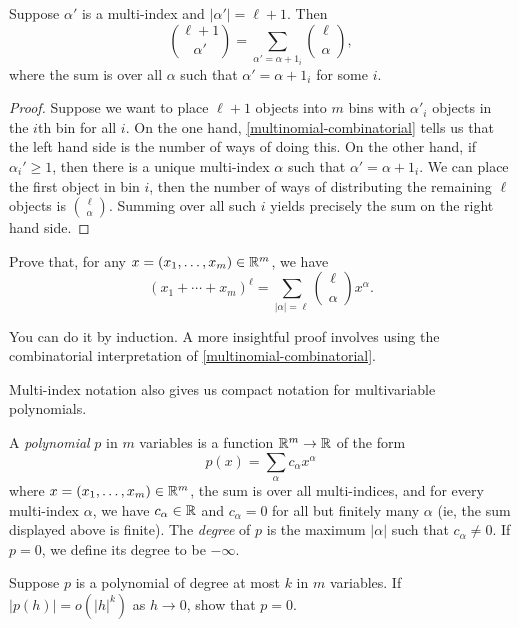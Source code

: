 \begin{corollary} \label{multinomial-recurrence}
	Suppose $\alpha'$ is a multi-index and $|\alpha'| = \ell + 1$. Then
	\[ \binom{\ell + 1}{\alpha'} = \sum_{\alpha' = \alpha + 1_i} \binom{\ell}{\alpha}, \]
	where the sum is over all $\alpha$ such that $\alpha' = \alpha + 1_i$ for some $i$. 
\end{corollary}

\begin{proof}
	Suppose we want to place $\ell + 1$ objects into $m$ bins with $\alpha'_i$ objects in the $i$th bin for all $i$. On the one hand, \cref{multinomial-combinatorial} tells us that the left hand side is the number of ways of doing this. On the other hand, if $\alpha_i' \geq 1$, then there is a unique multi-index $\alpha$ such that $\alpha' = \alpha + 1_i$. We can place the first object in bin $i$, then the number of ways of distributing the remaining $\ell$ objects is $\binom{\ell}{\alpha}$. Summing over all such $i$ yields precisely the sum on the right hand side. 
\end{proof}

\begin{exercise} \label{multinomial}
	Prove that, for any $x = (x_1, \dotsc, x_m) \in \mathbb{R}^m$, we have 
	\[ (x_1 + \dotsb + x_m)^\ell = \sum_{|\alpha| = \ell} \binom{\ell}{\alpha} x^\alpha. \]
	\begin{hint}
		You can do it by induction. A more insightful proof involves using the combinatorial interpretation of  \cref{multinomial-combinatorial}. 
	\end{hint} 
\end{exercise}

Multi-index notation also gives us compact notation for multivariable polynomials. 

\begin{definition}
	A \emph{polynomial} $p$ in $m$ variables is a function $\mathbb{R}^m \to \mathbb{R}$ of the form
	\[ p(x) = \sum_\alpha c_\alpha x^\alpha \]
	where $x = (x_1, \dotsc, x_m) \in \mathbb{R}^m$, the sum is over all multi-indices, and for every multi-index $\alpha$, we have $c_\alpha \in \mathbb{R}$ and $c_\alpha = 0$ for all but finitely many $\alpha$ (ie, the sum displayed above is finite). The \emph{degree} of $p$ is the maximum $|\alpha|$ such that $c_\alpha \neq 0$. If $p = 0$, we define its degree to be $-\infty$. 
\end{definition}

\begin{exercise} \label{small-polynomial-is-zero}
	Suppose $p$ is a polynomial of degree at most $k$ in $m$ variables. If $|p(h)| = o(|h|^k)$ as $h \to 0$, show that $p = 0$. 
\end{exercise}

